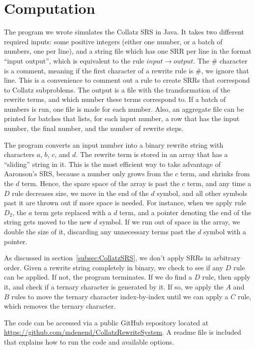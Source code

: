 \section{Computation} \label{subsec:rewritecomp}
The program we wrote simulates the Collatz SRS in Java. It takes two different required inputs: some positive integers (either one number, or a batch of numbers, one per line), and a string file which has one SRR per line in the format ``input output'', which is equivalent to the rule $input \rightarrow output$. The \# character is a comment, meaning if the first character of a rewrite rule is \#, we ignore that line. This is a convenience to comment out a rule to create SRRs that correspond to Collatz subproblems. The output is a file with the transformation of the rewrite terms, and which number these terms correspond to. If a batch of numbers is run, one file is made for each number. Also, an aggregate file can be printed for batches that lists, for each input number, a row that has the input number, the final number, and the number of rewrite steps. \par
The program converts an input number into a binary rewrite string with characters $a$, $b$, $c$, and $d$. The rewrite term is stored in an array that has a ``sliding'' string in it. This is the most efficient way to take advantage of Aaronson's SRS, because a number only grows from the $c$ term, and shrinks from the $d$ term. Hence, the spare space of the array is past the $c$ term, and any time a $D$ rule decreases size, we move in the end of the $d$ symbol, and all other symbols past it are thrown out if more space is needed. For instance, when we apply rule $D_2$, the $a$ term gets replaced with a $d$ term, and a pointer denoting the end of the string gets moved to the new $d$ symbol. If we run out of space in the array, we double the size of it, discarding any unnecessary terms past the $d$ symbol with a pointer. \par
As discussed in section~\ref{subsec:CollatzSRS}, we don't apply SRRs in arbitrary order. Given a rewrite string completely in binary, we check to see if any $D$ rule can be applied. If not, the program terminates. If we do find a $D$ rule, then apply it, and check if a ternary character is generated by it. If so, we apply the $A$ and $B$ rules to move the ternary character index-by-index until we can apply a $C$ rule, which removes the ternary character. \par
The code can be accessed via a public GitHub repository located at \url{https://github.com/mdenend/CollatzRewriteSystem}. A readme file is included that explains how to run the code and available options.


